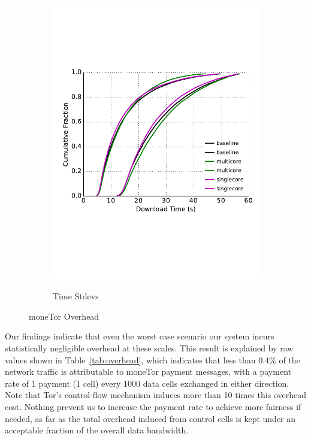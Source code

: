 \begin{figure}
\begin{subfigure}[t]{0.32\textwidth}
\includegraphics[trim={0 3cm 0 3cm}, clip, width=1.0\textwidth]{images/overhead_downloadtime.pdf}
		\label{fig:stats_c}
		\caption{Time Stdevs}
	\end{subfigure}
	\caption{moneTor Overhead}
	\label{fig:overhead}
\end{figure}

Our findings indicate that even the worst case scenario our system incurs
statistically negligible overhead at these scales. This result is explained by
raw values shown in Table~\ref{tab:overhead}, which indicates that less than
0.4\% of the network traffic is attributable to moneTor payment messages, with a payment rate of 1 payment (1 cell) every 1000 data cells exchanged in either direction. Note that Tor's control-flow mechanism induces more than 10 times this overhead cost. Nothing prevent us to increase the payment rate to achieve more fairness if needed, as far as the total overhead induced from control cells is kept under an acceptable fraction of the overall data bandwidth.

